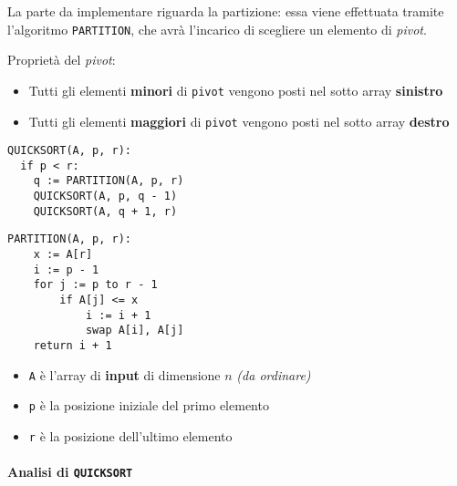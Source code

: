 \documentclass[italian, 10pt]{article}
\begin{document}
La parte  da implementare riguarda la partizione: essa viene effettuata tramite l'algoritmo \texttt{PARTITION}, che avrà l'incarico di scegliere un elemento di \textit{pivot}.

Proprietà del \textit{pivot}:

\begin{itemize}
  \item Tutti gli elementi \textbf{minori} di \texttt{pivot} vengono posti nel sotto array \textbf{sinistro}
  \item Tutti gli elementi \textbf{maggiori} di \texttt{pivot} vengono posti nel sotto array \textbf{destro}
\end{itemize}

\begin{center}
  \begin{minipage}[t]{0.495\textwidth}
    \begin{lstlisting}[style=pseudocode, caption={Pseudocodice dell'algoritmo \texttt{QUICKSORT}}, label={sec:algoritmo-quicksort}]
QUICKSORT(A, p, r):
  if p < r:
    q := PARTITION(A, p, r)
    QUICKSORT(A, p, q - 1)
    QUICKSORT(A, q + 1, r)
        \end{lstlisting}
  \end{minipage}
  \begin{minipage}[t]{0.495\textwidth}
    \begin{lstlisting}[style=pseudocode, caption={Pseudocodice dell'algoritmo \texttt{PARTITION}}, label={sec:algoritmo-partition}]
PARTITION(A, p, r):
    x := A[r]
    i := p - 1
    for j := p to r - 1
        if A[j] <= x
            i := i + 1
            swap A[i], A[j]
    return i + 1
  \end{lstlisting}
  \end{minipage}
\end{center}

\begin{itemize}
  \item \texttt{A} è l'array di \textbf{input} di dimensione \(n\) \textit{(da ordinare)}
  \item \texttt{p} è la posizione iniziale del primo elemento
  \item \texttt{r} è la posizione dell'ultimo elemento
\end{itemize}

\paragraph{Analisi di \texttt{QUICKSORT}}
\end{document}
